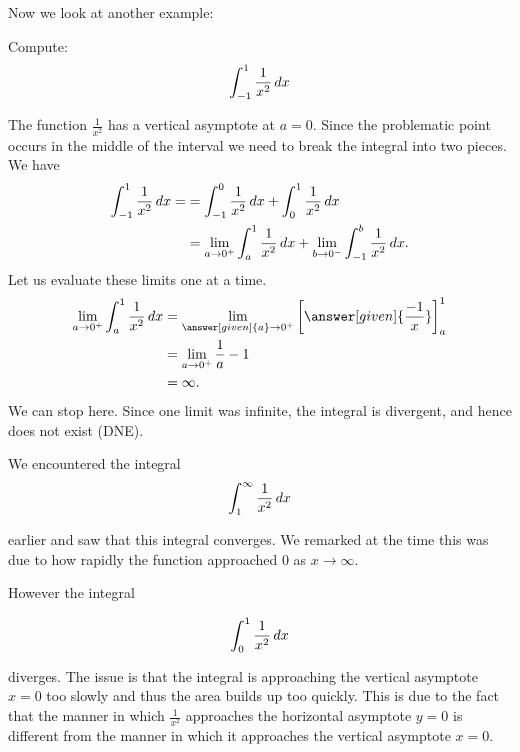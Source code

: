 \documentclass{ximera}
\begin{document}
Now we look at another example: 

\begin{example}	
  Compute:
  \[
  \int_{-1}^1 \frac{1}{x^2} \mathop{}\!d x
  \]
  \begin{explanation}
    The function $\frac{1}{x^2}$ has a vertical asymptote at $a=0$. Since the problematic point 
occurs in the middle of the interval we need to break the integral into two pieces.
  We have
\begin{align*}
  \int_{-1}^1 \frac{1}{x^{2}} \mathop{}\!d x =&= \int_{-1}^{0} \frac{1}{x^{2}} \mathop{}\!d x + \int_{0}^{1} \frac{1}{x^{2}} \mathop{}\!d x \\
&= \lim_{a \to 0^+} \int_{a}^1 \frac{1}{x^2} \mathop{}\!d x  + \lim_{b \to 0^-} \int_{-1}^{b} \frac{1}{x^2} \mathop{}\!d x.
 \end{align*}
  Let us evaluate these limits one at a time.
  \begin{align*}
    \lim_{a \to 0^+} \int_{a}^1 \frac{1}{x^2} \d x  &=  \lim_{\answer[given]{a} \to 0^+} \eval{\answer[given]{\frac{-1}{x}}}_a^1 \\
    &=  \lim_{a \to 0^+} \frac{1}{a}-1\\
    &= \infty.
  \end{align*}
    We can stop here. Since one limit was infinite, the integral is
    divergent, and hence does not exist (DNE). 
  \end{explanation}
\end{example}

\begin{remark}
We encountered the integral
\[
\int_{1}^{\infty} \frac{1}{x^{2}} \mathop{}\!d x 
\]

earlier and saw that this integral converges. We remarked at the time this was due to how rapidly the function approached $0$ as $x \to \infty$. 

However the integral

\[
\int_{0}^{1} \frac{1}{x^{2}} \mathop{}\!d x 
\]

diverges. The issue is that the integral is approaching the vertical asymptote $x=0$ too slowly and thus the area builds up too quickly. This is due to the fact that the manner in which $\frac{1}{x^{2}}$ approaches the horizontal asymptote $y=0$ is different from the manner in which 
it approaches the vertical asymptote $x=0$. 
\end{remark}
\end{document}
